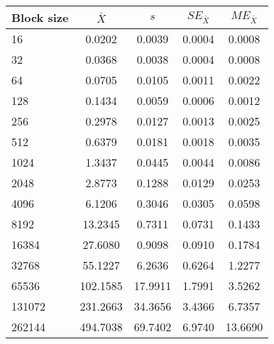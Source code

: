 \begin{tabular}{lcccc}\toprule
{\small Block size} & $\bar{X}$ & $s$ & $SE_{\bar{X}}$ & $ME_{\bar{X}}$ \\\midrule
16 & 0.0202 & 0.0039 & 0.0004 & 0.0008\\
32 & 0.0368 & 0.0038 & 0.0004 & 0.0008\\
64 & 0.0705 & 0.0105 & 0.0011 & 0.0022\\
128 & 0.1434 & 0.0059 & 0.0006 & 0.0012\\
256 & 0.2978 & 0.0127 & 0.0013 & 0.0025\\
512 & 0.6379 & 0.0181 & 0.0018 & 0.0035\\
1024 & 1.3437 & 0.0445 & 0.0044 & 0.0086\\
2048 & 2.8773 & 0.1288 & 0.0129 & 0.0253\\
4096 & 6.1206 & 0.3046 & 0.0305 & 0.0598\\
8192 & 13.2345 & 0.7311 & 0.0731 & 0.1433\\
16384 & 27.6080 & 0.9098 & 0.0910 & 0.1784\\
32768 & 55.1227 & 6.2636 & 0.6264 & 1.2277\\
65536 & 102.1585 & 17.9911 & 1.7991 & 3.5262\\
131072 & 231.2663 & 34.3656 & 3.4366 & 6.7357\\
262144 & 494.7038 & 69.7402 & 6.9740 & 13.6690\\
\bottomrule
\end{tabular}
